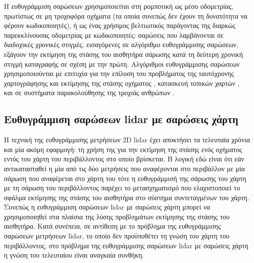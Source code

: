 \begin{gg_box}
\begin{remark}
\label{rem:sm_applications}
Η ευθυγράμμιση σαρώσεων χρησιμοποιείται στη ρομποτική ως μέσο οδομετρίας,
πρωτίστως σε μη τροχοφόρα οχήματα (τα οποία συνεπώς δεν έχουν τη δυνατότητα να
φέρουν κωδικοποιητές), ή ως ένας χρήσιμος βελτιωτικός παράγοντας της διαρκώς
παρεκκλίνουσας οδομετρίας με κωδικοποιητές: σαρώσεις που λαμβάνονται σε
διαδοχικές χρονικές στιγμές, εισαγόμενες σε αλγόριθμο ευθυγράμμισης
σαρώσεων, εξάγουν την εκτίμηση της στάσης του αισθητήρα σάρωσης κατά τη
δεύτερη χρονική στιγμή καταγραφής σε σχέση με την πρώτη. Αλγόριθμοι
ευθυγράμμισης σαρώσεων χρησιμοποιούνται με επιτυχία για την επίλυση του
προβλήματος της ταυτόχρονης χαρτογράφησης και εκτίμησης της στάσης οχήματος
\cite{Gutmann,Hahnel,Chieh-ChihWang}, κατασκευή τοπικών χαρτών
\cite{Lacroix2002a,Minguez,Montesano2008a}, και σε συστήματα παρακολούθησης της
τροχιάς ανθρώπων \cite{Schulz}.
\end{remark}
\end{gg_box}



\subsection{Ευθυγράμμιση σαρώσεων lidar με σαρώσεις χάρτη}
\label{subsec:01_01_02_6}

Η τεχνική της ευθυγράμμισης μετρήσεων 2D lidar έχει αποκτήσει τα τελευταία
χρόνια και μία ακόμη εφαρμογή: τη χρήση της για την εκτίμηση της στάσης ενός
οχήματος εντός του χάρτη του περιβάλλοντος στο οποίο βρίσκεται. Η λογική εδώ
είναι ότι εάν αντικατασταθεί η μία από τις δύο μετρήσεις που αναφέρονται στο
περιβάλλον με μία σάρωση που αναφέρεται στο χάρτη του τότε η ευθυγράμμισή
της σάρωσης του χάρτη με τη σάρωση του περιβάλλοντος παρέχει το μετασχηματισμό
που ελαχιστοποιεί το σφάλμα εκτίμησης της στάσης του αισθητήρα στο σύστημα
συντεταγμένων του χάρτη. Συνεπώς η ευθυγράμμιση σαρώσεων lidar με σαρώσεις
χάρτη μπορεί να χρησιμοποιηθεί στα πλαίσια της λύσης προβλημάτων εκτίμησης της
στάσης του αισθητήρα. Κατά συνέπεια, σε αντίθεση με το πρόβλημα της
ευθυγράμμισης σαρώσεων μετρήσεων lidar, το οποίο δεν προϋποθέτει τη γνώση του
χάρτη του περιβάλλοντος, στο πρόβλημα της ευθυγράμμισης σαρώσεων lidar με
σαρώσεις χάρτη η γνώση του τελευταίου είναι αναγκαία συνθήκη.


